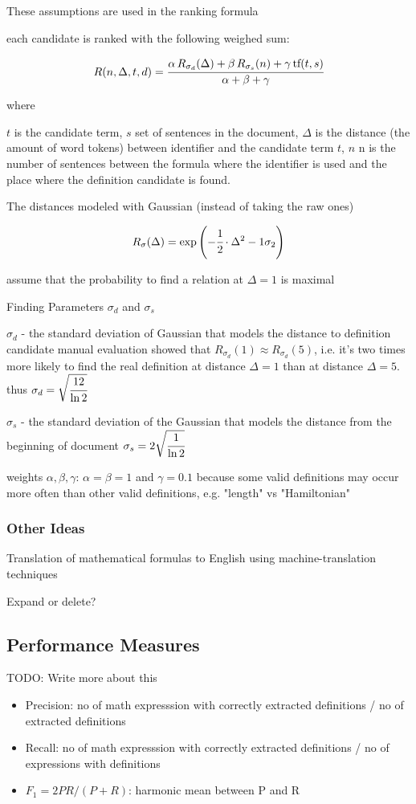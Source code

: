 These assumptions are used in the ranking formula

each candidate is ranked with the following weighed sum:

$$R(n, \Delta, t, d) = \cfrac{\alpha \, R_{\sigma_d}(\Delta) + \beta \, R_{\sigma_s}(n) + \gamma \, \text{tf}(t, s)}{\alpha + \beta + \gamma}$$

where

$t$ is the candidate term,
$s$ set of sentences in the document,
$\Delta$ is the distance (the amount of word tokens) between identifier and the candidate term $t$,
$n$ n is the number of sentences between the formula where the identifier is used and
the place where the definition candidate is found.

The distances modeled with Gaussian (instead of taking the raw ones)

$$R_{\sigma}(\Delta) = \exp \left( -\cfrac{1}{2} \cdot {\Delta^2 - 1}{\sigma_2} \right)$$

assume that the probability to find a relation at $\Delta = 1$ is maximal

Finding Parameters $\sigma_d$ and $\sigma_s$

$\sigma_d$ - the standard deviation of Gaussian that models the distance to definition candidate
manual evaluation showed that $R_{\sigma_d}(1) \approx R_{\sigma_d}(5)$,
i.e. it's two times more likely to find the real definition at distance $\Delta=1$
than at distance $\Delta=5$.
thus $\sigma_d = \sqrt{\cfrac{12}{\ln 2}}$


$\sigma_s$ - the standard deviation of the Gaussian that models the distance
from the beginning of document
%
$\sigma_s = 2 \sqrt{\cfrac{1}{\ln 2}}$


weights $\alpha, \beta, \gamma$:
$\alpha = \beta = 1$ and
$\gamma = 0.1$ because some valid definitions may occur more often than other
valid definitions, e.g. "length" vs "Hamiltonian"


\subsubsection{Other Ideas}
Translation of mathematical formulas to English using machine-translation techniques
\cite{nghiem2012towards}

Expand or delete?


\subsection{Performance Measures}

TODO: Write more about this

\begin{itemize}
  \item Precision: no of math expresssion with correctly extracted definitions / no of extracted definitions
  \item Recall: no of math expresssion with correctly extracted definitions / no of expressions with definitions
  \item $F_1 = 2PR / (P + R)$: harmonic mean between P and R
\end{itemize}


